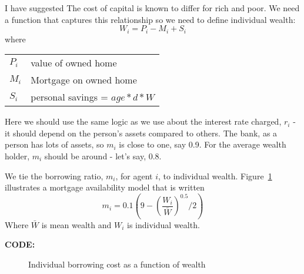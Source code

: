 I have suggested The cost of capital is known to differ for rich and poor. We need a function that captures this relationship so we need to define individual wealth:
\[W_i= P_i -M_i  +S_i\]
where 

\begin{tabular}{ll}
$P_i$ & value of owned home\\
$M_i$ & Mortgage on owned home\\
$S_i$ & personal savings = $age*d*W$\\
\end{tabular}

Here we should use the same logic as we use about the interest rate charged, $r_i$ - it should depend on the person's assets compared to others. The bank, as a person has lots of assets, so $m_i$ is close to one, say 0.9. For the average wealth holder, $m_i$ should be around - let's say, 0.8. 

We  tie the borrowing ratio, $m_i$,  for agent $i$, to individual wealth. Figure~\ref{Fig:Borrowingratio} illustrates a mortgage availability  model that is written 
 \[ m_i = 0.1(9-\left(\frac{W_i}{\bar W}\right)^{0.5}/2 )\]
Where $\bar{W}$ is mean wealth and $W_i$ is individual wealth. 




\textbf{CODE:}  

\begin{figure}
\caption{Individual borrowing cost as a function of wealth}
 \label{Fig:Borrowingratio}
\end{figure}



